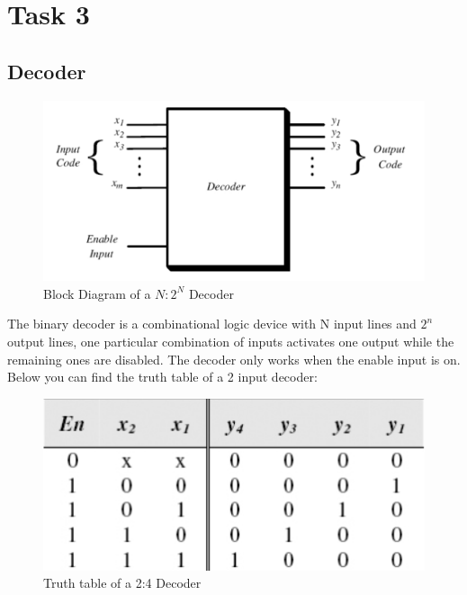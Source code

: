 

\section*{Task 3}

\subsection*{Decoder}

\begin{figure}[H]
  \begin{centering}
  \includegraphics[scale=1]{data/decoder.png}
  \par\end{centering}
  \caption{Block Diagram of a $N:2^{N}$ Decoder}
\end{figure}


The binary decoder is a combinational logic device with N input lines and $2^{n}$ output lines, one particular combination of inputs activates one output while the remaining ones are disabled. The decoder only works when the enable input is on. Below you can find the truth table of a 2 input decoder:

\begin{figure}[H]
  \begin{centering}
  \includegraphics[scale=1]{data/decodertable.png}
  \par\end{centering}
  \caption{Truth table of a 2:4 Decoder}
\end{figure}


